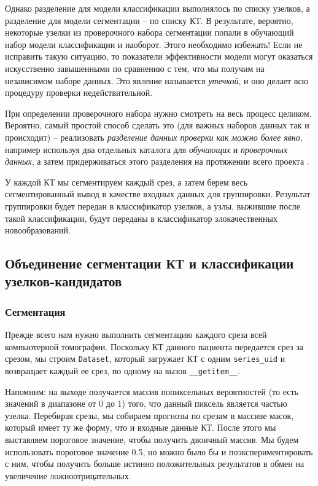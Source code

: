 \documentclass[%
	11pt,
	a4paper,
	utf8,
		]{article}
\begin{document}
Однако разделение для модели классификации выполнялось по списку узелков, а разделение для модели сегментации -- по списку КТ. В результате, вероятно, некоторые узелки из проверочного набора сегментации попали в обучающий набор модели классификации и наоборот. Этого необходимо избежать! Если не исправить такую ситуацию, то показатели эффективности модели могут оказаться искусственно завышенными по сравнению с тем, что мы получим на независимом наборе данных. Это явление называется \emph{утечкой}, и оно делает всю процедуру проверки недействительной.

При определении проверочного набора нужно смотреть на весь процесс целиком. Вероятно, самый простой способ сделать это (для важных наборов данных так и происходит) -- реализовать \emph{\color{blue}разделение данных проверки как можно более \emph{явно}}, например используя два отдельных каталога для \emph{обучающих} и \emph{проверочных данных}, а затем придерживаться этого разделения на протяжении всего проекта \cite[]{pytorch-2022}.

У каждой КТ мы сегментируем каждый срез, а затем берем весь сегментированный вывод в качестве входных данных для группировки. Результат группировки будет передан в классификатор узелков, а узлы, выжившие после такой классификации, будут переданы в классификатор злокачественных новообразований.

\subsection{Объединение сегментации КТ и классификации узелков-кандидатов}

\subsubsection{Сегментация}

Прежде всего нам нужно выполнить сегментацию каждого среза всей компьютерной томографии. Поскольку КТ данного пациента передается срез за срезом, мы строим \verb|Dataset|, который загружает КТ с одним \verb|series_uid| и возвращает каждый ее срез, по одному на вызов \verb|__getitem__|.

Напомним: на выходе получается массив попиксельных вероятностей (то есть значений в диапазоне от 0 до 1) того, что данный пиксель является частью узелка. Перебирая срезы, мы собираем прогнозы по срезам в массиве масок, который имеет ту же форму, что и входные данные КТ. После этого мы выставляем пороговое значение, чтобы получить двоичный массив. Мы будем использовать пороговое значение 0.5, но можно было бы и поэкспериментировать с ним, чтобы получить больше истинно положительных результатов в обмен на увеличение ложноотрицательных.
\end{document}
